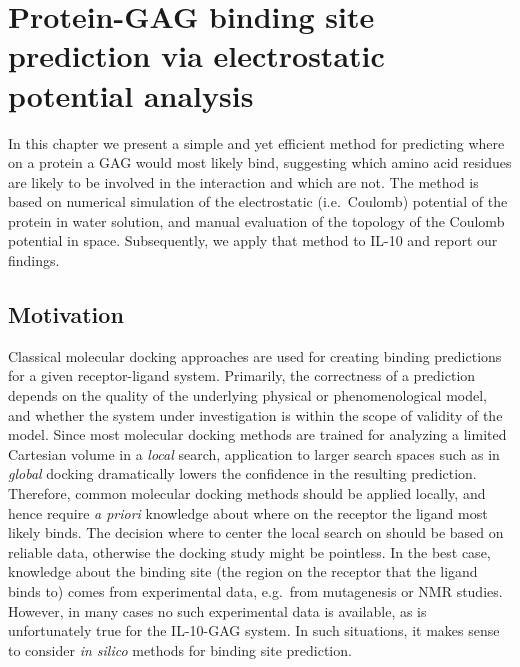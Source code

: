 \chapter{Protein-GAG binding site prediction via electrostatic potential analysis}

In this chapter we present a simple and yet efficient method for predicting
where on a protein a GAG would most likely bind, suggesting which amino acid
residues are likely to be involved in the interaction and which are not. The
method is based on numerical simulation of the electrostatic (i.e.\ Coulomb)
potential of the protein in water solution, and manual evaluation of the
topology of the Coulomb potential in space. Subsequently, we apply that method
to IL-10 and report our findings.

\section{Motivation}
\label{bspred:motivation}

Classical molecular docking approaches are used for creating binding predictions
for a given receptor-ligand system. Primarily, the correctness of a prediction
depends on the quality of the underlying physical or phenomenological model, and
whether the system under investigation is within the scope of validity of the
model. Since most molecular docking methods are trained for analyzing a limited
Cartesian volume in a \textit{local} search, application to larger search spaces
such as in \textit{global} docking dramatically lowers the confidence in the
resulting prediction. Therefore, common molecular docking methods should be
applied locally, and hence require \textit{a priori} knowledge about where on
the receptor the ligand most likely binds. The decision where to center the
local search on should be based on reliable data, otherwise the docking study
might be pointless. In the best case, knowledge about the binding site (the
region on the receptor that the ligand binds to) comes from experimental data,
e.g.\ from mutagenesis or NMR studies. However, in many cases no such
experimental data is available, as is unfortunately true for the IL-10-GAG
system. In such situations, it makes sense to consider \textit{in silico}
methods for binding site prediction.

